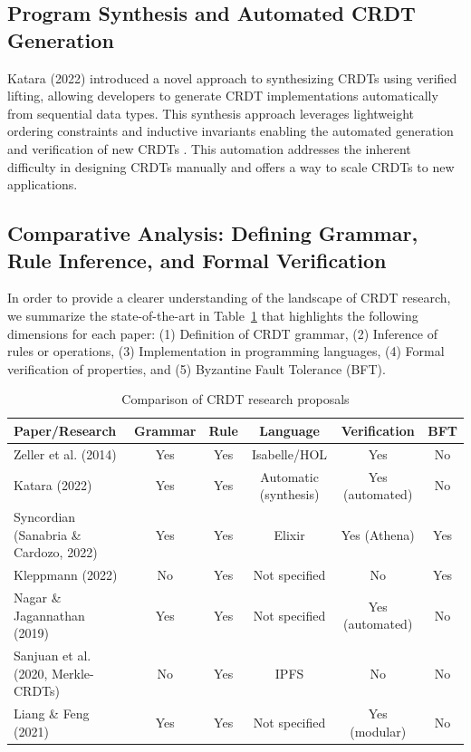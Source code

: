 \subsection{Program Synthesis and Automated CRDT Generation}

Katara (2022) introduced a novel approach to synthesizing CRDTs using verified lifting, allowing developers to generate CRDT implementations automatically from sequential data types. This synthesis approach leverages lightweight ordering constraints and inductive invariants enabling the automated generation and verification of new CRDTs \cite{laddad2022katara}. This automation addresses the inherent difficulty in designing CRDTs manually and offers a way to scale CRDTs to new applications.

\subsection{Comparative Analysis: Defining Grammar, Rule Inference, and Formal Verification}

In order to provide a clearer understanding of the landscape of CRDT research, we summarize the state-of-the-art in Table~\ref{tab:comparison} that highlights the following dimensions for each paper: (1) Definition of CRDT grammar, (2) Inference of rules or operations, (3) Implementation in programming languages, (4) Formal verification of properties, and (5) Byzantine Fault Tolerance (BFT).

\begin{table}[h!]
  \centering
  \small
  \setlength{\tabcolsep}{1pt}
  \caption{Comparison of CRDT research proposals}
  \label{tab:comparison}
  \begin{tabular}{lccccc}
    \toprule
    \textbf{Paper/Research} & \textbf{Grammar} & \textbf{Rule} &
    \textbf{Language} & \textbf{Verification} & \textbf{BFT} \\
    \midrule
    Zeller et al. (2014)                  & Yes & Yes & Isabelle/HOL          & Yes             & No  \\
    Katara (2022)                         & Yes & Yes & Automatic (synthesis) & Yes (automated) & No  \\
    Syncordian (Sanabria \& Cardozo, 2022)& Yes & Yes & Elixir                & Yes (Athena)    & Yes \\
    Kleppmann (2022)                      & No  & Yes & Not specified         & No              & Yes \\
    Nagar \& Jagannathan (2019)           & Yes & Yes & Not specified         & Yes (automated) & No  \\
    Sanjuan et al. (2020, Merkle-CRDTs)   & No  & Yes & IPFS                 & No              & No  \\
    Liang \& Feng (2021)                  & Yes & Yes & Not specified         & Yes (modular)   & No  \\
    \bottomrule
  \end{tabular}
\end{table}



